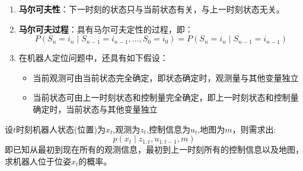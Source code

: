 \documentclass[../main.tex]{subfiles}
\begin{document}
\begin{enumerate}
\begin{enumerate}
        \item \textbf{马尔可夫性}：下一时刻的状态只与当前状态有关，与上一时刻状态无关。
        \item \textbf{马尔可夫过程}：具有马尔可夫定性的过程，即：
        $$ P\left( {{S}_{n} = {i}_{n} \mid  {S}_{n - 1} = {i}_{n - 1},\ldots ,{S}_{0} = {i}_{0}}\right)  = P\left( {{S}_{n} = {i}_{n} \mid  {S}_{n - 1} = {i}_{n - 1}}\right) $$
        \item 在机器人定位问题中，还具有如下假设：
            \begin{itemize}
                \item 当前观测可由当前状态完全确定，即状态确定时，观测量与其他变量独立
                \item 当前状态可由上一时刻状态和控制量完全确定，即上一时刻状态和控制量确定时，当前状态与其他变量独立
            \end{itemize}
        \end{enumerate}
        设$t$时刻机器人状态(位置)为$x_t$,观测为$z_t$,控制信息为$u_t$,地图为$m$，则需求出:
        $$p(x_t\mid z_{1:t},u_{1:t-1},m)$$
        即已知从最初到现在所有的观测信息，最初到上一时刻所有的控制信息以及地图，求机器人位于位姿$x_t$的概率。
        



    \end{enumerate}

\newpage
\end{document}

